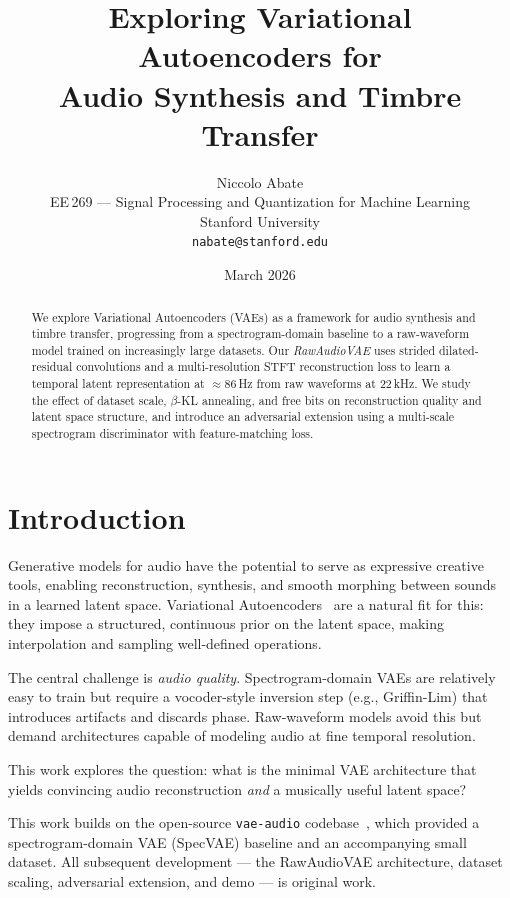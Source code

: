 \documentclass[10pt, twocolumn]{article}
\title{\textbf{Exploring Variational Autoencoders for\\Audio Synthesis and Timbre Transfer}}
\author{Niccolo Abate\\
    EE\,269 --- Signal Processing and Quantization for Machine Learning \\
    Stanford University\\
    \texttt{nabate@stanford.edu}}
\date{March 2026}
\newcommand{\TODO}[1]{\textcolor{red}{\textbf{[TODO: #1]}}}
\begin{document}
\maketitle

\begin{abstract}
    We explore Variational Autoencoders (VAEs) as a framework for audio synthesis
    and timbre transfer, progressing from a spectrogram-domain baseline to a
    raw-waveform model trained on increasingly large datasets.
    Our \textit{RawAudioVAE} uses strided dilated-residual convolutions and a
    multi-resolution STFT reconstruction loss to learn a temporal latent
    representation at $\approx$86\,Hz from raw waveforms at 22\,kHz.
    We study the effect of dataset scale, $\beta$-KL annealing, and free bits
    on reconstruction quality and latent space structure, and introduce an
    adversarial extension using a multi-scale spectrogram discriminator with
    feature-matching loss.
\end{abstract}

\section{Introduction}
\label{sec:intro}

Generative models for audio have the potential to serve as expressive
creative tools, enabling reconstruction, synthesis, and smooth morphing
between sounds in a learned latent space.
Variational Autoencoders~\cite{kingma2022autoencodingvariationalbayes} are a natural fit for this:
they impose a structured, continuous prior on the latent space, making
interpolation and sampling well-defined operations.

The central challenge is \textit{audio quality}.
Spectrogram-domain VAEs are relatively easy to train but require a
vocoder-style inversion step (e.g., Griffin-Lim) that introduces
artifacts and discards phase.
Raw-waveform models avoid this but demand architectures capable of
modeling audio at fine temporal resolution.

This work explores the question: what is the minimal VAE architecture that yields
convincing audio reconstruction \textit{and} a musically useful latent space?

This work builds on the open-source \texttt{vae-audio}
codebase~\cite{yjlolo}, which provided a spectrogram-domain VAE
(SpecVAE) baseline and an accompanying small dataset.
All subsequent development --- the RawAudioVAE architecture, dataset
scaling, adversarial extension, and demo --- is original work.
\end{document}
